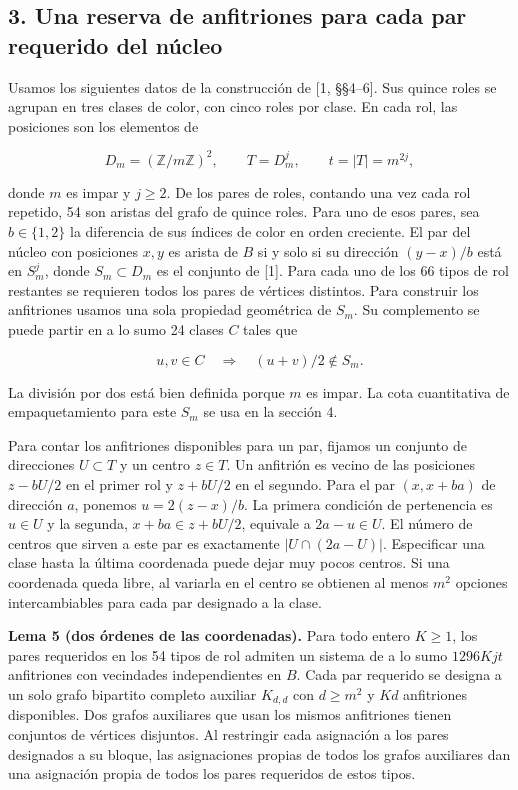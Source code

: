 \documentclass[spanish,11pt,a4paper]{article}
\begin{document}
\subsection{3. Una reserva de anfitriones para cada par requerido del núcleo}\label{una-reserva-de-anfitriones-para-cada-par-requerido-del-nuxfacleo}

Usamos los siguientes datos de la construcción de {[}1, §§4--6{]}. Sus quince roles se agrupan en tres clases de color, con cinco roles por clase. En cada rol, las posiciones son los elementos de

\[D_m=(\mathbb Z/m\mathbb Z)^2,\qquad T=D_m^j,\qquad t=|T|=m^{2j},\]

donde \(m\) es impar y \(j\ge2\). De los pares de roles, contando una vez cada rol repetido, 54 son aristas del grafo de quince roles. Para uno de esos pares, sea \(b\in\{1,2\}\) la diferencia de sus índices de color en orden creciente. El par del núcleo con posiciones \(x,y\) es arista de \(B\) si y solo si su dirección \((y-x)/b\) está en \(S_m^j\), donde \(S_m\subset D_m\) es el conjunto de {[}1{]}. Para cada uno de los 66 tipos de rol restantes se requieren todos los pares de vértices distintos. Para construir los anfitriones usamos una sola propiedad geométrica de \(S_m\). Su complemento se puede partir en a lo sumo 24 clases \(C\) tales que

\[u,v\in C\quad\Longrightarrow\quad (u+v)/2\notin S_m.
\tag{9}\]

La división por dos está bien definida porque \(m\) es impar. La cota cuantitativa de empaquetamiento para este \(S_m\) se usa en la sección 4.

Para contar los anfitriones disponibles para un par, fijamos un conjunto de direcciones \(U\subset T\) y un centro \(z\in T\). Un anfitrión es vecino de las posiciones \(z-bU/2\) en el primer rol y \(z+bU/2\) en el segundo. Para el par \((x,x+ba)\) de dirección \(a\), ponemos \(u=2(z-x)/b\). La primera condición de pertenencia es \(u\in U\) y la segunda, \(x+ba\in z+bU/2\), equivale a \(2a-u\in U\). El número de centros que sirven a este par es exactamente \(|U\cap(2a-U)|\). Especificar una clase hasta la última coordenada puede dejar muy pocos centros. Si una coordenada queda libre, al variarla en el centro se obtienen al menos \(m^2\) opciones intercambiables para cada par designado a la clase.

\textbf{Lema 5 (dos órdenes de las coordenadas).} Para todo entero \(K\ge1\), los pares requeridos en los 54 tipos de rol admiten un sistema de a lo sumo \(1296Kjt\) anfitriones con vecindades independientes en \(B\). Cada par requerido se designa a un solo grafo bipartito completo auxiliar \(K_{d,d}\) con \(d\ge m^2\) y \(Kd\) anfitriones disponibles. Dos grafos auxiliares que usan los mismos anfitriones tienen conjuntos de vértices disjuntos. Al restringir cada asignación a los pares designados a su bloque, las asignaciones propias de todos los grafos auxiliares dan una asignación propia de todos los pares requeridos de estos tipos.
\end{document}
